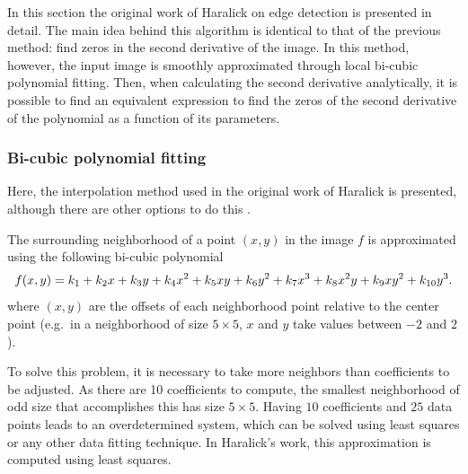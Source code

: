 \documentclass{ipol}
\numberwithin{equation}{section}
\numberwithin{table}{section}
\begin{document}
In this section the original work of Haralick \cite{bb20239} on edge detection is presented in detail.
The main idea behind this algorithm is identical to that of the previous method: find zeros in 
the second derivative of the image. In this method, however, the input image is smoothly approximated through local bi-cubic
polynomial fitting. Then, when calculating the second derivative analytically, it is possible to find 
an equivalent expression to find the zeros of the second derivative of the polynomial as a function of 
its parameters.%


\subsubsection{Bi-cubic polynomial fitting}
\label{sec:bicubic}

Here, the interpolation method used in the original work of Haralick is presented, although there are other options to do this \cite{getreuer}. 

The surrounding neighborhood of a point $(x,y)$ in the image $f$ is approximated using the following bi-cubic polynomial
\begin{equation}
	\label{eq:bicubic}
	f(x,y) = k_1 + k_2x + k_3y + k_4x^2 + k_5xy + k_6y^2 + k_7x^3 + k_8x^2y + k_9xy^2 + k_{10}y^3. \\
\end{equation}
where $(x,y)$ are the offsets of each neighborhood point relative to the center point (e.g.\ in a neighborhood of size $5\times5$, $x$ and $y$ take values ​​between $-2$ and $2$).

To solve this problem, it is necessary to take more neighbors than coefficients to be adjusted. As there are 10 coefficients to compute, the smallest 
neighborhood of odd size that accomplishes this has size $5\times5$. Having $10$ coefficients and $25$ data 
points leads to an overdetermined system, which can be solved using least squares or any other data fitting technique.
In Haralick's work, this approximation is computed using least squares.

\end{document}
